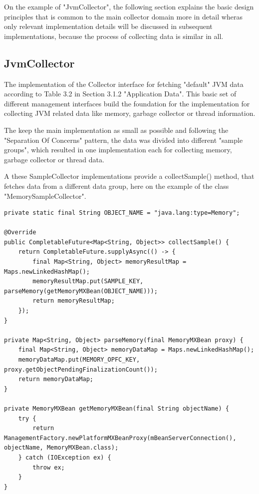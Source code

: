 On the example of "JvmCollector", the following section explains the basic design principles that is common
to the main collector domain more in detail wheras only relevant implementation details will be discussed in
subsequent implementations, because the process of collecting data is similar in all.

\subsection{JvmCollector}

The implementation of the Collector interface for fetching "default" JVM data according to Table 3.2 in
Section 3.1.2 "Application Data". This basic set of different management interfaces build the foundation
for the implementation for collecting JVM related data like memory, garbage collector or thread information.

The keep the main implementation as small as possible and following the "Separation Of Concerns" pattern,
the data was divided into different "sample groups", which resulted in one implementation each for collecting
memory, garbage collector or thread data.

A these SampleCollector implementations provide a collectSample() method, that fetches data from a different data group, here
on the example of the class "MemorySampleCollector".

\begin{lstlisting}[caption={MemorySampleCollector collectSample()}, captionpos=b, label={lst:memory-sample-collect}]
private static final String OBJECT_NAME = "java.lang:type=Memory";

@Override
public CompletableFuture<Map<String, Object>> collectSample() {
    return CompletableFuture.supplyAsync(() -> {
        final Map<String, Object> memoryResultMap = Maps.newLinkedHashMap();
        memoryResultMap.put(SAMPLE_KEY, parseMemory(getMemoryMXBean(OBJECT_NAME)));
        return memoryResultMap;
    });
}

private Map<String, Object> parseMemory(final MemoryMXBean proxy) {
    final Map<String, Object> memoryDataMap = Maps.newLinkedHashMap();
    memoryDataMap.put(MEMORY_OPFC_KEY, proxy.getObjectPendingFinalizationCount());
    return memoryDataMap;
}

private MemoryMXBean getMemoryMXBean(final String objectName) {
    try {
        return ManagementFactory.newPlatformMXBeanProxy(mBeanServerConnection(), objectName, MemoryMXBean.class);
    } catch (IOException ex) {
        throw ex;
    }
}
\end{lstlisting}

